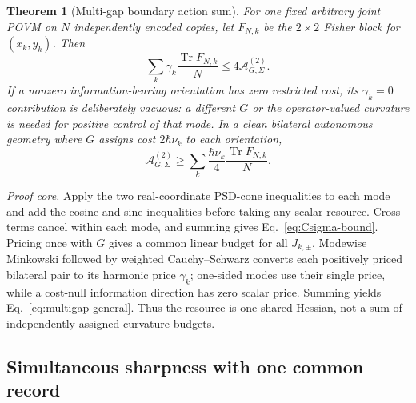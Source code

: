 \documentclass[aps,pra,preprint,nofootinbib]{revtex4-2}
\newtheorem{theorem}{Theorem}
\newcommand{\Tr}{\operatorname{Tr}}
\newcommand{\Fcl}{F}
\newcommand{\Aact}{\mathcal A}
\begin{document}
\begin{theorem}[Multi-gap boundary action sum]
\label{thm:multigap}
For one fixed arbitrary joint POVM on $N$ independently encoded copies, let $\Fcl_{N,k}$ be the $2\times2$ Fisher block for $(x_k,y_k)$. Then
\begin{equation}
\boxed{
\sum_k\gamma_k\frac{\Tr \Fcl_{N,k}}{N}
\le4\Aact_{G,\Sigma}^{(2)}.
}
\label{eq:multigap-general}
\end{equation}
If a nonzero information-bearing orientation has zero restricted cost, its $\gamma_k=0$ contribution is deliberately vacuous: a different $G$ or the operator-valued curvature is needed for positive control of that mode. In a clean bilateral autonomous geometry where $G$ assigns cost $2\hbar\nu_k$ to each orientation,
\begin{equation}
\boxed{
\Aact_{G,\Sigma}^{(2)}
\ge
\sum_k\frac{\hbar\nu_k}{4}
\frac{\Tr \Fcl_{N,k}}{N}.
}
\label{eq:multigap-clean}
\end{equation}
\end{theorem}

\emph{Proof core.} Apply the two real-coordinate PSD-cone inequalities to each mode and add the cosine and sine inequalities before taking any scalar resource. Cross terms cancel within each mode, and summing gives Eq.~\eqref{eq:Csigma-bound}. Pricing once with $G$ gives a common linear budget for all $J_{k,\pm}$. Modewise Minkowski followed by weighted Cauchy--Schwarz converts each positively priced bilateral pair to its harmonic price $\gamma_k$; one-sided modes use their single price, while a cost-null information direction has zero scalar price. Summing yields Eq.~\eqref{eq:multigap-general}. Thus the resource is one shared Hessian, not a sum of independently assigned curvature budgets.

\subsection{Simultaneous sharpness with one common record}
\end{document}
